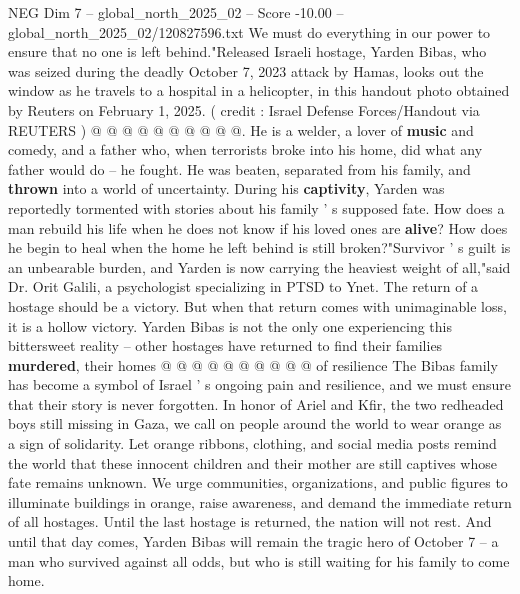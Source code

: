 \begin{textsample}{NEG Dim 7 – global\_north\_2025\_02 – Score -10.00 – global\_north\_2025\_02/120827596.txt}
We must do everything in our power to ensure that no one is left behind."Released Israeli hostage, Yarden Bibas, who was seized during the deadly October 7, 2023 attack by Hamas, looks out the window as he travels to a hospital in a helicopter, in this handout photo obtained by Reuters on February 1, 2025. ( credit : Israel Defense Forces/Handout via REUTERS ) @ @ @ @ @ @ @ @ @ @.
He is a welder, a lover of \textbf{music} and comedy, and a father who, when terrorists broke into his home, did what any father would do -- he fought.
He was beaten, separated from his family, and \textbf{thrown} into a world of uncertainty.
During his \textbf{captivity}, Yarden was reportedly tormented with stories about his family ' s supposed fate.
How does a man rebuild his life when he does not know if his loved ones are \textbf{alive}?
How does he begin to heal when the home he left behind is still broken?"Survivor ' s guilt is an unbearable burden, and Yarden is now carrying the heaviest weight of all,"said Dr.
Orit Galili, a psychologist specializing in PTSD to Ynet.
The return of a hostage should be a victory.
But when that return comes with unimaginable loss, it is a hollow victory.
Yarden Bibas is not the only one experiencing this bittersweet reality -- other hostages have returned to find their families \textbf{murdered}, their homes @ @ @ @ @ @ @ @ @ @ of resilience The Bibas family has become a symbol of Israel ' s ongoing pain and resilience, and we must ensure that their story is never forgotten.
In honor of Ariel and Kfir, the two redheaded boys still missing in Gaza, we call on people around the world to wear orange as a sign of solidarity.
Let orange ribbons, clothing, and social media posts remind the world that these innocent children and their mother are still captives whose fate remains unknown.
We urge communities, organizations, and public figures to illuminate buildings in orange, raise awareness, and demand the immediate return of all hostages.
Until the last hostage is returned, the nation will not rest.
And until that day comes, Yarden Bibas will remain the tragic hero of October 7 -- a man who survived against all odds, but who is still waiting for his family to come home.

\end{textsample}
